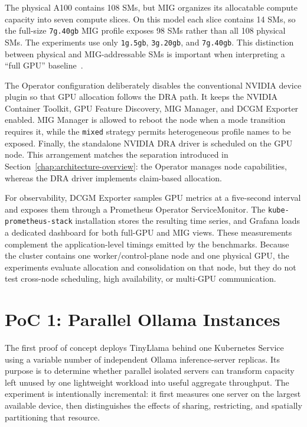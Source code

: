 The physical A100 contains 108 SMs, but MIG organizes its allocatable compute capacity into seven compute slices. On this model each slice contains 14 SMs, so the full-size \texttt{7g.40gb} MIG profile exposes 98 SMs rather than all 108 physical SMs. The experiments use only \texttt{1g.5gb}, \texttt{3g.20gb}, and \texttt{7g.40gb}. This distinction between physical and MIG-addressable SMs is important when interpreting a ``full GPU'' baseline~\cite{nvidia2026gpuperformance,nvidia2026migconcepts}.

The Operator configuration deliberately disables the conventional NVIDIA device plugin so that GPU allocation follows the DRA path. It keeps the NVIDIA Container Toolkit, GPU Feature Discovery, MIG Manager, and DCGM Exporter enabled. MIG Manager is allowed to reboot the node when a mode transition requires it, while the \texttt{mixed} strategy permits heterogeneous profile names to be exposed. Finally, the standalone NVIDIA DRA driver is scheduled on the GPU node. This arrangement matches the separation introduced in Section~\ref{chap:architecture-overview}: the Operator manages node capabilities, whereas the DRA driver implements claim-based allocation.

For observability, DCGM Exporter samples GPU metrics at a five-second interval and exposes them through a Prometheus Operator ServiceMonitor. The \texttt{kube-prometheus-stack} installation stores the resulting time series, and Grafana loads a dedicated dashboard for both full-GPU and MIG views. These measurements complement the application-level timings emitted by the benchmarks. Because the cluster contains one worker/control-plane node and one physical GPU, the experiments evaluate allocation and consolidation on that node, but they do not test cross-node scheduling, high availability, or multi-GPU communication.

\section{PoC 1: Parallel Ollama Instances}
\label{sec:multi-ollama}

The first proof of concept deploys TinyLlama behind one Kubernetes Service using a variable number of independent Ollama inference-server replicas. Its purpose is to determine whether parallel isolated servers can transform capacity left unused by one lightweight workload into useful aggregate throughput. The experiment is intentionally incremental: it first measures one server on the largest available device, then distinguishes the effects of sharing, restricting, and spatially partitioning that resource.

